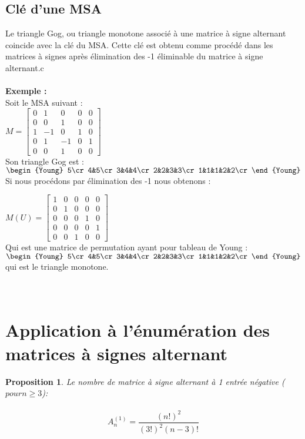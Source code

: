 \documentclass{book}
\newtheorem{petit_nom1}{Proposition}
\begin{document}
\subsection{Clé d'une MSA}
Le triangle Gog, ou triangle monotone associé à une matrice à signe alternant coincide avec la clé du MSA. Cette clé est obtenu comme procédé dans les matrices à signes après élimination des -1 éliminable du matrice à signe alternant.c \\ \\
\textbf{Exemple :}\\
Soit le MSA suivant :\\
$M=\begin{bmatrix}
0&1&0&0&0\\0&0&1&0&0\\1&-1&0&1&0\\0&1&-1&0&1\\0&0&1&0&0
\end{bmatrix}$ \\

Son triangle Gog est : 
$\begin{Young}
5\cr
4&5\cr
3&4&4\cr
2&2&3&3\cr
1&1&1&2&2\cr
\end{Young}  $ \\

Si nous procédons par élimination des -1 nous obtenons :

$M(U)=\begin{bmatrix}
1&0&0&0&0\\0&1&0&0&0\\0&0&0&1&0\\0&0&0&0&1\\0&0&1&0&0
\end{bmatrix}$\\
Qui est une matrice de permutation ayant pour tableau de Young : \\
$\begin{Young}
5\cr
4&5\cr
3&4&4\cr
2&2&3&3\cr
1&1&1&2&2\cr
\end{Young}  $\\
qui est le triangle monotone.\\\\\\

\section{Application à l'énumération des matrices à signes alternant}
\begin{petit_nom1}
Le nombre de matrice à signe alternant à 1 entrée négative ($pour n \geq 3$): \\\\
\begin{equation}
A_n^{(1)}=\frac{(n!)^2}{(3!)^2(n-3)!}
\end{equation}
\end{petit_nom1}
\end{document}
